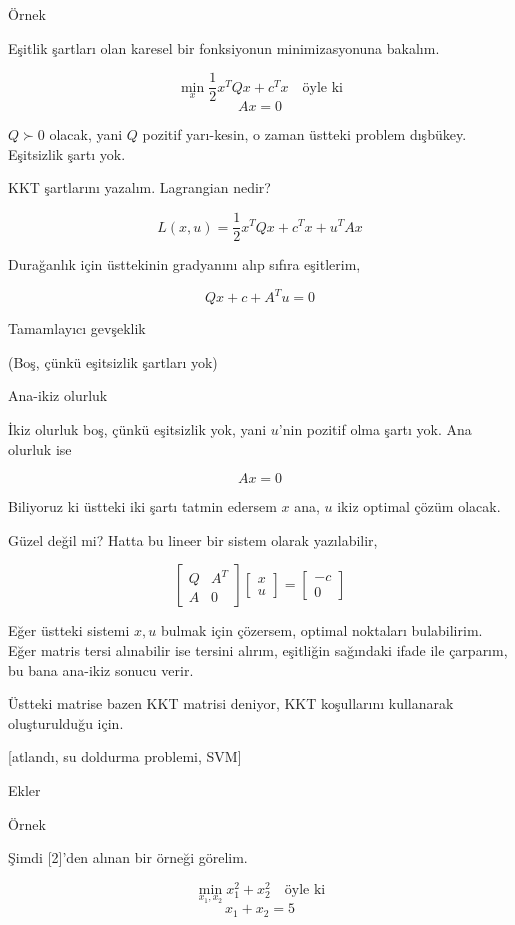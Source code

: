 \documentclass[12pt,fleqn]{article}\usepackage{../../common}
\begin{document}
Örnek

Eşitlik şartları olan karesel bir fonksiyonun minimizasyonuna bakalım. 

$$
\min_x \frac{1}{2} x^T Q x + c^T x \quad \textrm{öyle ki}
$$
$$
Ax = 0
$$

$Q \succ 0$ olacak, yani $Q$ pozitif yarı-kesin, o zaman üstteki problem
dışbükey. Eşitsizlik şartı yok.

KKT şartlarını yazalım. Lagrangian nedir? 

$$
L(x,u) = \frac{1}{2} x^T Q x + c^T x + u^T A x
$$

Durağanlık için üsttekinin gradyanını alıp sıfıra eşitlerim, 

$$
Qx + c + A^T u = 0
$$

Tamamlayıcı gevşeklik

(Boş, çünkü eşitsizlik şartları yok)

Ana-ikiz olurluk

İkiz olurluk boş, çünkü eşitsizlik yok, yani $u$'nin pozitif olma şartı
yok. Ana olurluk ise 

$$
Ax = 0
$$

Biliyoruz ki üstteki iki şartı tatmin edersem $x$ ana, $u$ ikiz optimal
çözüm olacak. 

Güzel değil mi? Hatta bu lineer bir sistem olarak yazılabilir,

$$
\left[\begin{array}{ccc}
Q & A^T \\ A & 0
\end{array}\right]
\left[\begin{array}{c}
x \\ u
\end{array}\right] =
\left[\begin{array}{r}
-c \\ 0
\end{array}\right] 
$$

Eğer üstteki sistemi $x,u$ bulmak için çözersem, optimal noktaları
bulabilirim. Eğer matris tersi alınabilir ise tersini alırım, eşitliğin
sağındaki ifade ile çarparım, bu bana ana-ikiz sonucu verir. 

Üstteki matrise bazen KKT matrisi deniyor, KKT koşullarını kullanarak
oluşturulduğu için. 

[atlandı, su doldurma problemi, SVM]

Ekler

Örnek

Şimdi [2]'den alınan bir örneği görelim. 

$$
\min_{x_1,x_2} x_1^2 + x_2^2 \quad \textrm{öyle ki}
$$
$$
x_1 + x_2 = 5
$$
\end{document}
